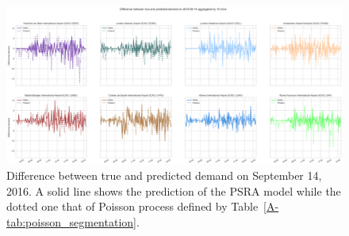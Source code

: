 \documentclass[]{elsarticle}
\begin{document}
\begin{figure}
    \includegraphics[width=\textwidth]{prediction_last_day}
    \caption{Difference between true and predicted demand on September 14, 2016. A solid line shows the prediction of the \acs{PSRA} model while the dotted one that of Poisson process defined by Table~\ref{A-tab:poisson_segmentation}.}\label{fig:pred_last_day}
\end{figure}
\end{document}
